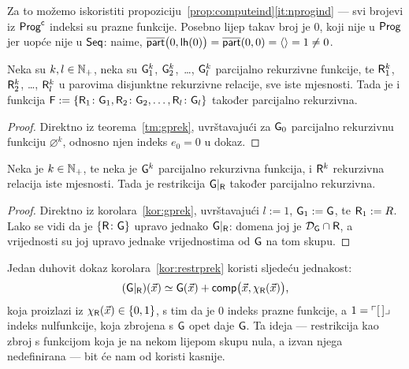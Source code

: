 Za to možemo iskoristiti propoziciju~\ref{prop:computeind}\eqref{it:nprogind} --- svi brojevi iz $\mathsf{Prog}\sp{\textup{\textsf c}}$ indeksi su prazne funkcije. Posebno lijep takav broj je $0$, koji nije u $\mathsf{Prog}$ jer uopće nije u $\mathsf{Seq}$: naime, $\overline{\mathsf{part}}\bigl(0,\mathsf{lh}(0)\bigr)=\overline{\mathsf{part}}(0,0)=\langle\rangle=1\not=0$.

\begin{korolar}\label{kor:gprek}
Neka su $k,l\in{\mathbb N}_+$, neka su $\mathsf G_1^k$, $\mathsf G_2^k$,~\ldots, $\mathsf G_l^k$ parcijalno rekurzivne funkcije, te $\mathsf R_1^k$, $\mathsf R_2^k$, \ldots, $\mathsf R_l^k$ u parovima disjunktne rekurzivne relacije, sve iste mjesnosti. Tada je i funkcija $\mathsf F:=\{\mathsf R_1\colon\mathsf G_1,\mathsf R_2\colon\mathsf G_2,\dotsc,\mathsf R_l\colon\mathsf G_l\}$ također parcijalno rekurzivna.
\end{korolar}
\begin{proof}
Direktno iz teorema~\ref{tm:gprek}, uvrštavajući za $\mathsf G_0$ parcijalno rekurzivnu funkciju $\varnothing^k$, odnosno njen indeks $e_0=0$ u dokaz.
\end{proof}

\begin{korolar}\label{kor:restrprek}
Neka je $k\in{\mathbb N}_+$, te neka je $\mathsf G^k$ parcijalno rekurzivna funkcija, i $\mathsf R^k$ rekurzivna relacija iste mjesnosti. Tada je restrikcija $\mathsf G|_{\mathsf R}$ također parcijalno rekurzivna.
\end{korolar}
\begin{proof}
Direktno iz korolara~\ref{kor:gprek}, uvrštavajući $l:=1$, $\mathsf G_1:=\mathsf G$, te $\mathsf R_1:=R$. Lako se vidi da je $\{\mathsf R\colon\mathsf G\}$ upravo jednako $\mathsf G|_{\mathsf R}$: domena joj je $\mathcal D_{\mathsf G}\cap\mathsf R$, a vrijednosti su joj upravo jednake vrijednostima od $\mathsf G$ na tom skupu.
\end{proof}

\begin{napomena}
Jedan duhovit dokaz korolara~\ref{kor:restrprek} koristi sljedeću jednakost:
\begin{equation}
    (\mathsf G|_{\mathsf R})(\vec x)\simeq\mathsf G(\vec x)+\mathsf{comp}\bigl(\vec x,\chi_{\mathsf R}(\vec x)\bigr)\text,
\end{equation}
koja proizlazi iz $\chi_{\mathsf R}(\vec x)\in\{0,1\}$, s tim da je $0$ indeks prazne funkcije, a $1=\ulcorner[\,]\lrcorner$ indeks nulfunkcije, koja zbrojena s $\mathsf G$ opet daje $\mathsf G$. Ta ideja --- restrikcija kao zbroj s funkcijom koja je na nekom lijepom skupu nula, a izvan njega nedefinirana --- bit će nam od koristi kasnije.
\end{napomena}